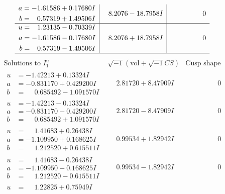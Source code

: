 \documentclass[1p]{elsarticle_modified}
\theoremstyle{definition}
\newcommand{\I}{\sqrt{-1}}
\begin{document}
$$\begin{array}{c|c|c}
\begin{aligned}
a &= -1.61586 + 0.17680 I \\
b &= \phantom{-}0.57319 + 1.49506 I\end{aligned}
 & \phantom{-}8.2076 - 18.7958 I & \phantom{-0.000000 } 0 \\ \hline\begin{aligned}
u &= \phantom{-}1.23135 - 0.70339 I \\
a &= -1.61586 - 0.17680 I \\
b &= \phantom{-}0.57319 - 1.49506 I\end{aligned}
 & \phantom{-}8.2076 + 18.7958 I & \phantom{-0.000000 } 0\\
 \hline 
 \end{array}$$\newpage$$\begin{array}{c|c|c}  
\text{Solutions to }I^u_{1}& \I (\text{vol} + \sqrt{-1}CS) & \text{Cusp shape}\\
 \hline 
\begin{aligned}
u &= -1.42213 + 0.13324 I \\
a &= -0.831170 + 0.429200 I \\
b &= \phantom{-}0.685492 - 1.091570 I\end{aligned}
 & \phantom{-}2.81720 + 8.47909 I & \phantom{-0.000000 } 0 \\ \hline\begin{aligned}
u &= -1.42213 - 0.13324 I \\
a &= -0.831170 - 0.429200 I \\
b &= \phantom{-}0.685492 + 1.091570 I\end{aligned}
 & \phantom{-}2.81720 - 8.47909 I & \phantom{-0.000000 } 0 \\ \hline\begin{aligned}
u &= \phantom{-}1.41683 + 0.26438 I \\
a &= -1.109950 + 0.168625 I \\
b &= \phantom{-}1.212520 + 0.615511 I\end{aligned}
 & \phantom{-}0.99534 + 1.82942 I & \phantom{-0.000000 } 0 \\ \hline\begin{aligned}
u &= \phantom{-}1.41683 - 0.26438 I \\
a &= -1.109950 - 0.168625 I \\
b &= \phantom{-}1.212520 - 0.615511 I\end{aligned}
 & \phantom{-}0.99534 - 1.82942 I & \phantom{-0.000000 } 0 \\ \hline\begin{aligned}
u &= \phantom{-}1.22825 + 0.75949 I \\

\end{aligned}
\end{array}$$
\end{document}
